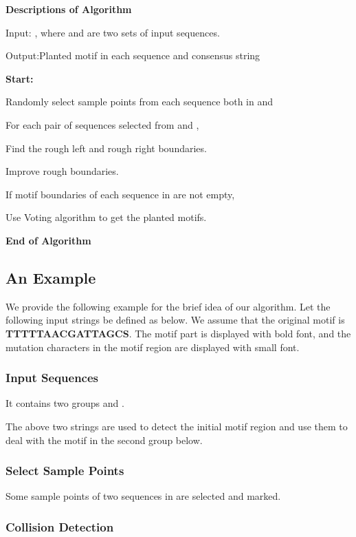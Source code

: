 \documentclass[11pt]{article}
\begin{document}
{\bf Descriptions of Algorithm}

Input: , where  and
 are two sets of input sequences.

Output:Planted motif in each sequence and consensus string

{\bf Start:}

Randomly select sample points from each sequence both in  and 

For each pair of sequences selected from  and ,

\qquad  Find the rough left and rough right boundaries.

\qquad  Improve rough boundaries.

If motif boundaries of each sequence in  are not empty,

\qquad  Use Voting algorithm to get the planted motifs.

{\bf End of Algorithm}



 \subsection{An Example}


We provide the following example for the brief idea of our
algorithm. Let the following input strings be defined as below. We
assume that the original motif is {\bf TTTTTAACGATTAGCS}. The motif
part is displayed with bold font, and the mutation characters in the
motif region are displayed with small font.


\subsubsection{Input Sequences}

It contains two groups  and
.



The above two strings are used to detect the initial motif region
and use them to deal with the motif in the second group below.






\subsubsection{Select Sample Points}

Some sample points of two sequences in  are selected and
marked.



\subsubsection{Collision Detection}
\end{document}
